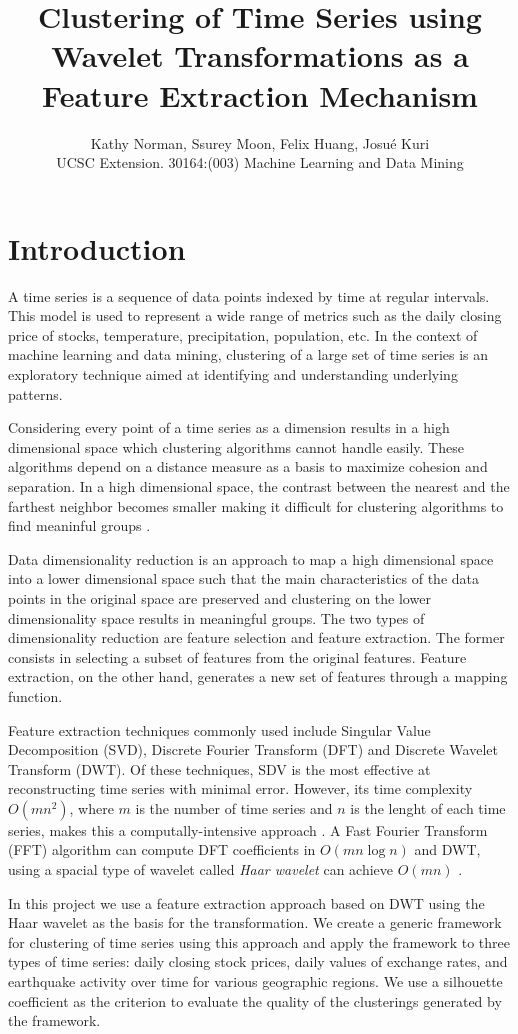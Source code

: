 \documentclass{article}
\title{Clustering of Time Series using Wavelet Transformations as a Feature Extraction Mechanism}
\author{\textsf{Kathy Norman, Ssurey Moon, Felix Huang, Josu\'e Kuri}\\UCSC Extension. 30164:(003) Machine Learning and Data Mining}
\begin{document}
\maketitle

\section{Introduction}
A time series is a sequence of data points indexed by time at regular intervals. This model is used to represent a wide range of metrics such as the daily closing price of stocks, temperature, precipitation, population, etc. In the context of machine learning and data mining, clustering of a large set of time series is an exploratory technique aimed at identifying and understanding underlying patterns.

Considering every point of a time series as a dimension results in a high dimensional space which clustering algorithms cannot handle easily. These algorithms depend on a distance measure as a basis to maximize cohesion and separation. In a high dimensional space, the contrast between the nearest and the farthest neighbor becomes smaller making it difficult for clustering algorithms to find meaninful groups \cite{BGRS99}.

Data dimensionality reduction is an approach to map a high dimensional space into a lower dimensional space such that the main characteristics of the data points in the original space are preserved and clustering on the lower dimensionality space results in meaningful groups. The two types of dimensionality reduction are feature selection and feature extraction. The former consists in selecting a subset of features from the original features. Feature extraction, on the other hand, generates a new set of features through a mapping function.

Feature extraction techniques commonly used include Singular Value Decomposition (SVD), Discrete Fourier Transform (DFT) and Discrete Wavelet Transform (DWT). Of these techniques, SDV is the most effective at reconstructing time series with minimal error. However, its time complexity $O(mn^2)$, where $m$ is the number of time series and $n$ is the lenght of each time series, makes this a computally-intensive approach \cite{ZHZL06}. A Fast Fourier Transform (FFT) algorithm can compute DFT coefficients in $O(mn \log n)$ and DWT, using a spacial type of wavelet called {\em Haar wavelet} can achieve $O(mn)$ \cite{ZHZL06}.

In this project we use a feature extraction approach based on DWT using the Haar wavelet as the basis for the transformation. We create a generic framework for clustering of time series using this approach and apply the framework to three types of time series: daily closing stock prices, daily values of exchange rates, and earthquake activity over time for various geographic regions. We use a silhouette coefficient as the criterion to evaluate the quality of the clusterings generated by the framework.
\end{document}
